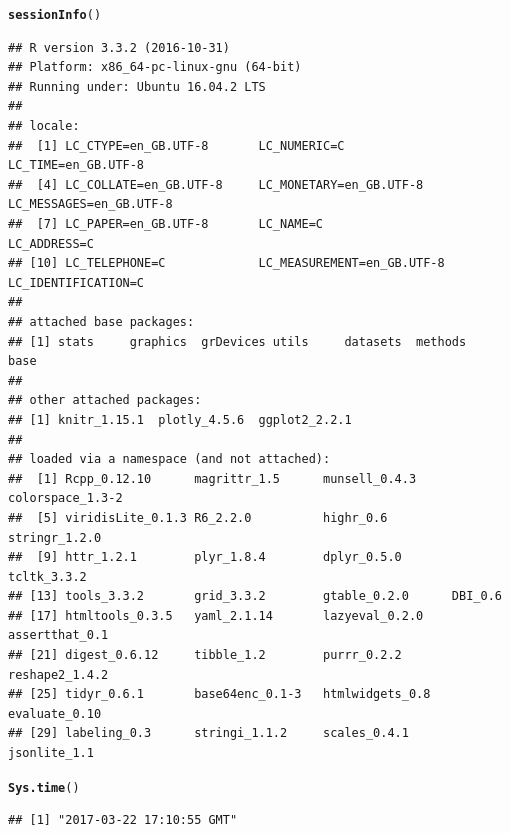 \documentclass{article}\usepackage[]{graphicx}\usepackage[]{color}
\makeatletter
\newcommand{\hlstd}[1]{\textcolor[rgb]{0.345,0.345,0.345}{#1}}%
\newcommand{\hlkwd}[1]{\textcolor[rgb]{0.737,0.353,0.396}{\textbf{#1}}}%
\newenvironment{kframe}{%
 \def\at@end@of@kframe{}%
 \ifinner\ifhmode%
  \def\at@end@of@kframe{\end{minipage}}%
  \begin{minipage}{\columnwidth}%
 \fi\fi%
 \def\FrameCommand##1{\hskip\@totalleftmargin \hskip-\fboxsep
 \colorbox{shadecolor}{##1}\hskip-\fboxsep
     \hskip-\linewidth \hskip-\@totalleftmargin \hskip\columnwidth}%
 \MakeFramed {\advance\hsize-\width
   \@totalleftmargin\z@ \linewidth\hsize
   \@setminipage}}%
 {\par\unskip\endMakeFramed%
 \at@end@of@kframe}
\newenvironment{knitrout}{}{} %
\makeatother
\begin{document}
\begin{knitrout}
\color{fgcolor}\begin{kframe}
\begin{alltt}
\hlkwd{sessionInfo}\hlstd{()}
\end{alltt}
\begin{verbatim}
## R version 3.3.2 (2016-10-31)
## Platform: x86_64-pc-linux-gnu (64-bit)
## Running under: Ubuntu 16.04.2 LTS
## 
## locale:
##  [1] LC_CTYPE=en_GB.UTF-8       LC_NUMERIC=C               LC_TIME=en_GB.UTF-8       
##  [4] LC_COLLATE=en_GB.UTF-8     LC_MONETARY=en_GB.UTF-8    LC_MESSAGES=en_GB.UTF-8   
##  [7] LC_PAPER=en_GB.UTF-8       LC_NAME=C                  LC_ADDRESS=C              
## [10] LC_TELEPHONE=C             LC_MEASUREMENT=en_GB.UTF-8 LC_IDENTIFICATION=C       
## 
## attached base packages:
## [1] stats     graphics  grDevices utils     datasets  methods   base     
## 
## other attached packages:
## [1] knitr_1.15.1  plotly_4.5.6  ggplot2_2.2.1
## 
## loaded via a namespace (and not attached):
##  [1] Rcpp_0.12.10      magrittr_1.5      munsell_0.4.3     colorspace_1.3-2 
##  [5] viridisLite_0.1.3 R6_2.2.0          highr_0.6         stringr_1.2.0    
##  [9] httr_1.2.1        plyr_1.8.4        dplyr_0.5.0       tcltk_3.3.2      
## [13] tools_3.3.2       grid_3.3.2        gtable_0.2.0      DBI_0.6          
## [17] htmltools_0.3.5   yaml_2.1.14       lazyeval_0.2.0    assertthat_0.1   
## [21] digest_0.6.12     tibble_1.2        purrr_0.2.2       reshape2_1.4.2   
## [25] tidyr_0.6.1       base64enc_0.1-3   htmlwidgets_0.8   evaluate_0.10    
## [29] labeling_0.3      stringi_1.1.2     scales_0.4.1      jsonlite_1.1
\end{verbatim}
\begin{alltt}
\hlkwd{Sys.time}\hlstd{()}
\end{alltt}
\begin{verbatim}
## [1] "2017-03-22 17:10:55 GMT"
\end{verbatim}
\end{kframe}
\end{knitrout}
\end{document}
